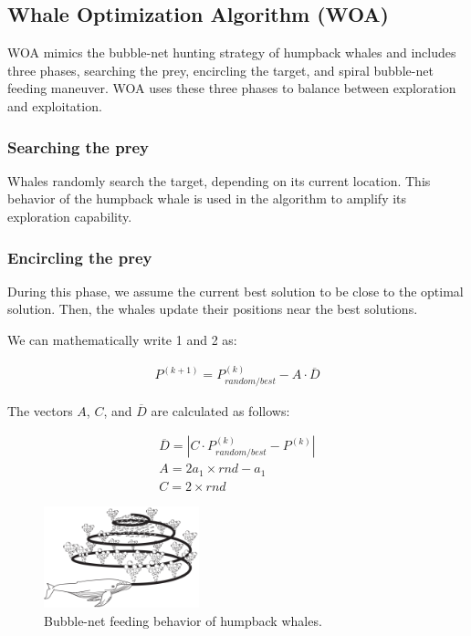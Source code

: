 \documentclass[conference]{IEEEtran}
\begin{document}
\subsection{Whale Optimization Algorithm (WOA)}

WOA mimics the bubble-net hunting strategy of humpback whales and includes three phases, searching the prey, encircling the target, and spiral bubble-net feeding maneuver. 
WOA uses these three phases to balance be­tween exploration and exploitation.

\subsubsection{Searching the prey}

Whales randomly search the target, depending on its current location. 
This behavior of the humpback whale is used in the algorithm to amplify its exploration capability.

\subsubsection{Encircling the prey}

During this phase, we assume the current best solution to be close to the optimal solution. 
Then, the whales update their positions near the best solutions.

We can mathematically write 1 and 2 as:

\setlength{\arraycolsep}{0em}
\begin{eqnarray}
    P^{(k+1)}=P^{(k)}_{random/best}-A\cdot \overline{D}
\end{eqnarray}
\setlength{\arraycolsep}{0pt}

The vectors $A$, $C$, and $\overline{D}$ are calculated as follows:

\setlength{\arraycolsep}{0em}
\begin{eqnarray}
    \overline{D}=| C\cdot P^{(k)}_{random/best}-P^{(k)}| \\
    A = 2a_1 \times rnd - a_1 \\
    C = 2 \times rnd
\end{eqnarray}
\setlength{\arraycolsep}{0pt}

\begin{figure}[ht]
    \centering
    \includegraphics[width=0.4\textwidth]{bubble-net}
    \caption{Bubble-net feeding behavior of humpback whales.}
    \label{fig:bubble-net}
\end{figure}
\end{document}
